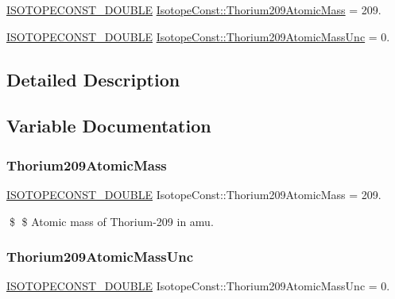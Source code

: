 \begin{DoxyCompactItemize}
\item 
\mbox{\hyperlink{group___isotope_const-_macros_ga8f45a7272ce02c0b4c65c44636ed719a}{I\+S\+O\+T\+O\+P\+E\+C\+O\+N\+S\+T\+\_\+\+D\+O\+U\+B\+LE}} \mbox{\hyperlink{group___isotope_const-_thorium-_th209_gaf4bf5b9031b5fd631ba45a7083184ff6}{Isotope\+Const\+::\+Thorium209\+Atomic\+Mass}} = 209.
\item 
\mbox{\hyperlink{group___isotope_const-_macros_ga8f45a7272ce02c0b4c65c44636ed719a}{I\+S\+O\+T\+O\+P\+E\+C\+O\+N\+S\+T\+\_\+\+D\+O\+U\+B\+LE}} \mbox{\hyperlink{group___isotope_const-_thorium-_th209_gaf8616cd785a9a99d7442bf44503133f9}{Isotope\+Const\+::\+Thorium209\+Atomic\+Mass\+Unc}} = 0.
\end{DoxyCompactItemize}


\subsection{Detailed Description}


\subsection{Variable Documentation}
\mbox{\label{group___isotope_const-_thorium-_th209_gaf4bf5b9031b5fd631ba45a7083184ff6}} 
\subsubsection{\texorpdfstring{Thorium209\+Atomic\+Mass}{Thorium209AtomicMass}}
{\footnotesize\ttfamily \mbox{\hyperlink{group___isotope_const-_macros_ga8f45a7272ce02c0b4c65c44636ed719a}{I\+S\+O\+T\+O\+P\+E\+C\+O\+N\+S\+T\+\_\+\+D\+O\+U\+B\+LE}} Isotope\+Const\+::\+Thorium209\+Atomic\+Mass = 209.}

\$ \$ Atomic mass of Thorium-\/209 in amu. \mbox{\label{group___isotope_const-_thorium-_th209_gaf8616cd785a9a99d7442bf44503133f9}} 
\subsubsection{\texorpdfstring{Thorium209\+Atomic\+Mass\+Unc}{Thorium209AtomicMassUnc}}
{\footnotesize\ttfamily \mbox{\hyperlink{group___isotope_const-_macros_ga8f45a7272ce02c0b4c65c44636ed719a}{I\+S\+O\+T\+O\+P\+E\+C\+O\+N\+S\+T\+\_\+\+D\+O\+U\+B\+LE}} Isotope\+Const\+::\+Thorium209\+Atomic\+Mass\+Unc = 0.}

